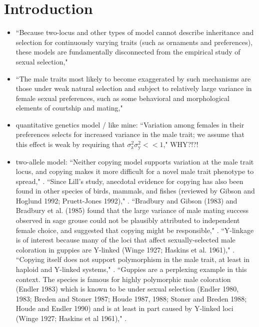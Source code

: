 \documentclass{article}
\newcommand{\x}[1]{\text{#1}}
\begin{document}
\section{Introduction}
\begin{itemize}
\item ``Because two-locus and other types of model cannot describe inheritance and selection for continuously varying traits (such as ornaments and preferences), these models are fundamentally disconnected from the empirical study of sexual selection," \cite{Mead:2004uq}

\item ``The male traits most likely to become exaggerated by such mechanisms are those under weak natural selection and subject to relatively large variance in female sexual preferences, such as some behavioral and morphological elements of courtship and mating," \cite{Lande:1981fk}

\item quantitative genetics model / like mine: ``Variation among females in their preferences selects for increased variance in the male trait; we assume that this effect is weak by requiring that $\sigma_\x{z}^2\sigma_\x{y}^2<<1$," \cite{Kirkpatrick:1990kx} WHY?!?!

\item two-allele model: ``Neither copying model supports variation at the male trait locus, and copying makes it more difficult for a novel male trait phenotype to spread," \cite{Kirkpatrick:1994vn}. ``Since Lill's study, anecdotal evidence for copying has also been found in other species of birds, mammals, and fishes (reviewed by Gibson and Hoglund 1992; Pruett-Jones 1992)," \cite{Kirkpatrick:1994vn}. ``Bradbury and Gibson (1983) and Bradbury et al. (1985) found that the large variance of male mating success observed in sage grouse could not be plausibly attributed to independent female choice, and suggested that copying might be responsible," \cite{Kirkpatrick:1994vn}. ``Y-linkage is of interest because many of the loci that affect sexually-selected male coloration in guppies are Y-linked (Winge 1927; Haskins et al. 1961)," \cite{Kirkpatrick:1994vn}. ``Copying itself does not support polymorphism in the male trait, at least in haploid and Y-linked systems," \cite{Kirkpatrick:1994vn}. ``Guppies are a perplexing example in this context. The species is famous for highly polymorphic male coloration (Endler 1983) which is known to be under sexual selection (Endler 1980, 1983; Breden and Stoner 1987; Houde 1987, 1988; Stoner and Breden 1988; Houde and Endler 1990) and is at least in part caused by Y-linked loci (Winge 1927; Haskins et al 1961)," \cite{Kirkpatrick:1994vn}.


\end{itemize}
\end{document}
